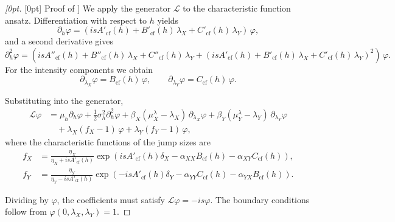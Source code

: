 \documentclass{article}
\theoremstyle{definition}
\newenvironment{delayedproof}[1]
 {\begin{proof}[\raisedtarget{#1}Proof of \Cref{#1}]}
 {\end{proof}}
\newcommand{\raisedtarget}[1]{%
  \raisebox{\fontcharht\font`P}[0pt][0pt]{\hypertarget{#1}{}}%
}
\begin{document}
\begin{delayedproof}{prop:cf_riccati}
We apply the generator $\mathcal{L}$ to the characteristic function ansatz. Differentiation with respect to $h$ yields
\[
\partial_h \varphi 
= \left( i s A'_{\text{cf}}(h) + B'_{\text{cf}}(h)\,\lambda_X + C'_{\text{cf}}(h)\,\lambda_Y \right)\,\varphi,
\]
and a second derivative gives
\[
\partial_h^2 \varphi 
= \left( i s A''_{\text{cf}}(h) + B''_{\text{cf}}(h)\,\lambda_X + C''_{\text{cf}}(h)\,\lambda_Y 
+ \left(i s A'_{\text{cf}}(h) + B'_{\text{cf}}(h)\,\lambda_X + C'_{\text{cf}}(h)\,\lambda_Y\right)^2 \right)\,\varphi.
\]
For the intensity components we obtain
\[
\partial_{\lambda_X}\varphi = B_{\text{cf}}(h)\,\varphi, 
\qquad 
\partial_{\lambda_Y}\varphi = C_{\text{cf}}(h)\,\varphi.
\]

Substituting into the generator,
\[
\begin{aligned}
\mathcal{L}\varphi &= 
\mu_h \partial_h \varphi 
+ \frac{1}{2}\sigma_h^2 \partial_h^2 \varphi
+ \beta_X(\mu_X^\lambda - \lambda_X)\,\partial_{\lambda_X}\varphi
+ \beta_Y(\mu_Y^\lambda - \lambda_Y)\,\partial_{\lambda_Y}\varphi \\
&\quad + \lambda_X(f_X - 1)\,\varphi + \lambda_Y(f_Y - 1)\,\varphi,
\end{aligned}
\]
where the characteristic functions of the jump sizes are
\[
\begin{aligned}
f_X &= \frac{\eta_X}{\eta_X + i s A'_{\text{cf}}(h)} 
\exp\!\left( i s A'_{\text{cf}}(h)\delta_X - \alpha_{XX} B_{\text{cf}}(h) - \alpha_{XY} C_{\text{cf}}(h) \right), \\
f_Y &= \frac{\eta_Y}{\eta_Y - i s A'_{\text{cf}}(h)} 
\exp\!\left( -i s A'_{\text{cf}}(h)\delta_Y - \alpha_{YY} C_{\text{cf}}(h) - \alpha_{YX} B_{\text{cf}}(h) \right).
\end{aligned}
\]

Dividing by $\varphi$, the coefficients must satisfy $\mathcal{L}\varphi = -i s \varphi$. The boundary conditions follow from $\varphi(0, \lambda_X, \lambda_Y) = 1$.
\end{delayedproof}
\end{document}
